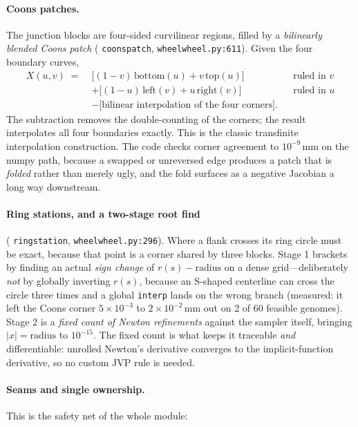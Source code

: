 \documentclass[11pt,a4paper]{article}
\DeclareRobustCommand{\code}[1]{%
  \texttt{\small\def\_{\textunderscore\discretionary{}{}{}}#1}}
\newcommand{\at}[2]{\code{#1:#2}}
\begin{document}
\paragraph{Coons patches.}
The junction blocks are four-sided curvilinear regions, filled by a \emph{bilinearly
blended Coons patch} (\code{coons\_patch}, \at{wheel\_wheel.py}{611}). Given the four
boundary curves,
%
\begin{align}
  X(u,v) \;=\;& \bigl[(1-v)\,\mathrm{bottom}(u) + v\,\mathrm{top}(u)\bigr]
                && \text{ruled in } v \nonumber\\
              &+ \bigl[(1-u)\,\mathrm{left}(v) + u\,\mathrm{right}(v)\bigr]
                && \text{ruled in } u \nonumber\\
              &- \bigl[\text{bilinear interpolation of the four corners}\bigr].
  \label{eq:coons}
\end{align}
%
The subtraction removes the double-counting of the corners; the result interpolates all
four boundaries exactly. This is the classic transfinite interpolation construction.
The code checks corner agreement to $10^{-9}$\,mm on the numpy path, because a swapped
or unreversed edge produces a patch that is \emph{folded} rather than merely ugly, and
the fold surfaces as a negative Jacobian a long way downstream.

\paragraph{Ring stations, and a two-stage root find}
(\code{ring\_station}, \at{wheel\_wheel.py}{296}). Where a flank crosses its ring circle
must be exact, because that point is a corner shared by three blocks. Stage 1 brackets
by finding an actual \emph{sign change} of $r(s) - \mathrm{radius}$ on a dense
grid---deliberately \emph{not} by globally inverting $r(s)$, because an S-shaped
centerline can cross the circle three times and a global \code{interp} lands on the
wrong branch (measured: it left the Coons corner $5\times10^{-3}$ to
$2\times10^{-2}$\,mm out on 2 of 60 feasible genomes). Stage 2 is a \emph{fixed count of
Newton refinements} against the sampler itself, bringing $|x| = \mathrm{radius}$ to
$10^{-15}$. The fixed count is what keeps it traceable \emph{and} differentiable:
unrolled Newton's derivative converges to the implicit-function derivative, so no
custom JVP rule is needed.

\paragraph{Seams and single ownership.}
This is the safety net of the whole module:
\end{document}
